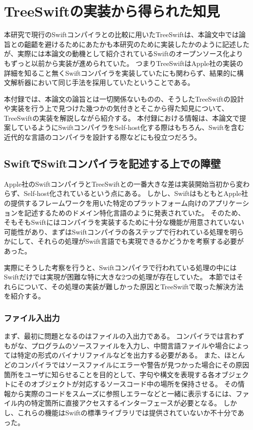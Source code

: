 \appendix
\chapter{TreeSwiftの実装から得られた知見}

本研究で現行のSwiftコンパイラとの比較に用いたTreeSwiftは、本論文中では論旨との齟齬を避けるためにあたかも本研究のために実装したかのように記述したが、実際には本論文の動機として紹介されているSwiftのオープンソース化よりもずっと以前から実装が進められていた。
つまりTreeSwiftはApple社の実装の詳細を知ること無くSwiftコンパイラを実装していたにも関わらず、結果的に構文解析器において同じ手法を採用していたということである。

本付録では、本論文の論旨とは一切関係ないものの、そうしたTreeSwiftの設計や実装を行う上で見つけた幾つかの気付きとそこから得た知見について、TreeSwiftの実装を解説しながら紹介する。
本付録における情報は、本論文で提案しているようにSwiftコンパイラをSelf-host化する際はもちろん、Swiftを含む近代的な言語のコンパイラを設計する際などにも役立つだろう。


\section{SwiftでSwiftコンパイラを記述する上での障壁}

Apple社のSwiftコンパイラとTreeSwiftとの一番大きな差は実装開始当初から変わらず、Self-host化されているという点にある。
しかし、SwiftはもともとApple社の提供するフレームワークを用いた特定のプラットフォーム向けのアプリケーションを記述するためのドメイン特化言語のように発表されていた。
そのため、そもそもSwiftにはコンパイラを実装するために十分な機能が用意されていない可能性があり、まずはSwiftコンパイラの各ステップで行われている処理を明らかにして、それらの処理がSwift言語でも実現できるかどうかを考察する必要があった。

実際にそうした考察を行うと、Swiftコンパイラで行われている処理の中にはSwiftだけでは実現が困難な特に大きな2つの処理が存在していた。
本節ではそれらについて、その処理の実装が難しかった原因とTreeSwiftで取った解決方法を紹介する。

\subsection{ファイル入出力}

まず、最初に問題となるのはファイルの入出力である。
コンパイラでは言わずもがな、プログラムのソースファイルを入力し、中間言語ファイルや場合によっては特定の形式のバイナリファイルなどを出力する必要がある。
また、ほとんどのコンパイラではソースファイルにエラーや警告が見つかった場合にその原因箇所をユーザに知らせることを目的として、字句や構文を表現する各オブジェクトにそのオブジェクトが対応するソースコード中の場所を保持させる。
その情報から実際のコードをスムーズに参照しエラーなどと一緒に表示するには、ファイル内の特定箇所に直接アクセスするインターフェースが必要となる。
しかし、これらの機能はSwiftの標準ライブラリでは提供されていないか不十分であった。

